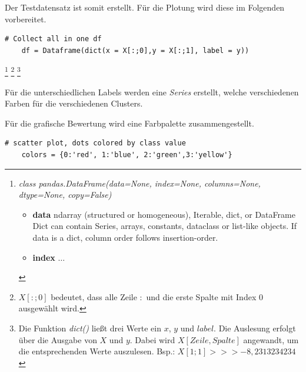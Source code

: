 Der Testdatensatz ist somit erstellt. Für die Plotung wird diese im Folgenden vorbereitet.
\begin{lstlisting}[style=Python]
	# Collect all in one df
	df = Dataframe(dict(x = X[:;0],y = X[:;1], label = y))
\end{lstlisting}\footnote{\textit{class pandas.DataFrame(data=None, index=None, columns=None, dtype=None, copy=False)}
	\begin{itemize}
		\item \textbf{data} ndarray (structured or homogeneous), Iterable, dict, or DataFrame\\
		Dict can contain Series, arrays, constants, dataclass or list-like objects. If data is a dict, column order follows insertion-order.
		\item \textbf{index} $\dots$
\end{itemize}} \footnote{$X[:;0]$ bedeutet, dass alle Zeile $:$ und die erste Spalte mit Index $0$ ausgewählt wird.}
\footnote{Die Funktion \textit{dict()} ließt drei Werte ein $x$, $y$ und $label$. Die Auslesung erfolgt über die Ausgabe von $X$ und $y$. Dabei wird $X[\textit{Zeile},\textit{Spalte}]$ angewandt, um die entsprechenden Werte auszulesen. Bsp.: $X[1;1] >>> -8,2313234234$
}

Für die unterschiedlichen Labels werden eine \textit{Series} erstellt, welche verschiedenen Farben für die verschiedenen Clusters.

Für die grafische Bewertung wird eine Farbpalette zusammengestellt.
\begin{lstlisting}[style=Python]
	# scatter plot, dots colored by class value
	colors = {0:'red', 1:'blue', 2:'green',3:'yellow'}
\end{lstlisting}
